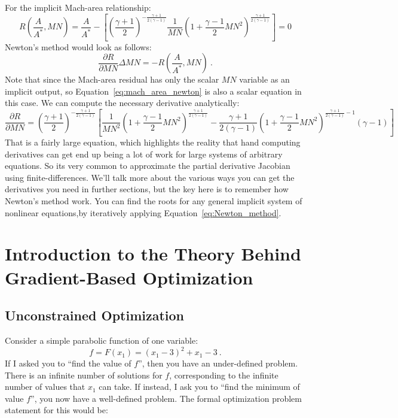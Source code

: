 \documentclass[conf]{new-aiaa}
\begin{document}
For the implicit Mach-area relationship: 
\begin{equation}
    R(\frac{A}{A^*}, MN) = \frac{A}{A^*} - \left[ \left(\frac{\gamma+1}{2}\right)^{-\frac{\gamma+1}{2(\gamma-1)}} 
                    \frac{1}{MN} 
                    \left( 1 + \frac{\gamma-1}{2}MN^2 \right)^{\frac{\gamma+1}{2(\gamma-1)}}\right] = 0
                    \label{eq:implicit_mach_area}
\end{equation}
Newton's method would look as follows: 
\begin{equation}
    \frac{\partial R}{\partial MN} \Delta MN = -R(\frac{A}{A^*}, MN) \ .
    \label{eq:mach_area_newton}
\end{equation}
Note that since the Mach-area residual has only the scalar $MN$ variable as an implicit output, so Equation~\eqref{eq:mach_area_newton} 
is also a scalar equation in this case. 
We can compute the necessary derivative analytically: 
\begin{equation}
    \frac{\partial R}{\partial MN} = \left(\frac{\gamma+1}{2}\right)^{-\frac{\gamma+1}{2(\gamma-1)}} 
    \left[\frac{1}{MN^2} \left( 1 + \frac{\gamma-1}{2}MN^2 \right)^{\frac{\gamma+1}{2(\gamma-1)}} - 
       \frac{\gamma+1}{2(\gamma-1)}\left( 1 + \frac{\gamma-1}{2}MN^2 \right)^{\frac{\gamma+1}{2(\gamma-1)} - 1}(\gamma-1)
    \right] 
\end{equation}
That is a fairly large equation, which highlights the reality that hand computing derivatives can get end up being a lot of work for large systems of arbitrary equations. 
So its very common to approximate the partial derivative Jacobian using finite-differences. 
We'll talk more about the various ways you can get the derivatives you need in further sections, 
but the key here is to remember how Newton's method work. 
You can find the roots for any general implicit system of nonlinear equations,by iteratively applying Equation~\eqref{eq:Newton_method}. 


\section{Introduction to the Theory Behind Gradient-Based Optimization}

    \subsection{Unconstrained Optimization}
    Consider a simple parabolic function of one variable:
    \begin{equation}
        f = F(x_1) = (x_1 - 3)^2 + x_1 - 3 \ . 
    \end{equation}
    If I asked you to ``find the value of $f$'', then you have an under-defined problem. 
    There is an infinite number of solutions for $f$, corresponding to the infinite number of values that $x_1$ can take. 
    If instead, I ask you to ``find the minimum of value $f$'', you now have a well-defined problem.    
    The formal optimization problem statement for this would be: 
\end{document}
